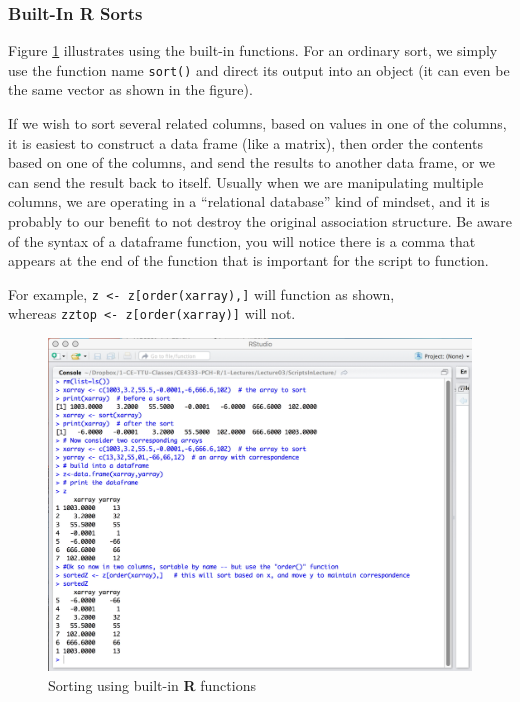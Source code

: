 \subsubsection{Built-In \textbf{R} Sorts}

Figure \ref{fig:BuiltInRSorts.jpg} illustrates using the built-in functions.  
For an ordinary sort, we simply use the function name \texttt{sort()} and direct its output into an object (it can even be the same vector as shown in the figure). 

If we wish to sort several related columns, based on values in one of the columns, it is easiest to construct a data frame (like a matrix), then order the contents based on one of the columns, and send the results to another data frame, or we can send the result back to itself.  Usually when we are manipulating multiple columns, we are operating in a ``relational database'' kind of mindset, and it is probably to our benefit to not destroy the original association structure.  Be aware of the syntax of a dataframe function, you will notice there is a comma that appears at the end of the function that is important for the script to function.

For example, \texttt{z <- z[order(xarray),]} will function as shown, \\ whereas \texttt{zztop <- z[order(xarray)]} will not.

\begin{figure}[h!] %
   \centering
   \includegraphics[width=6in]{./2-Algorithms/BuiltInRSorts.jpg} 
   \caption{Sorting using built-in \textbf{R} functions}
   \label{fig:BuiltInRSorts.jpg}
\end{figure}

